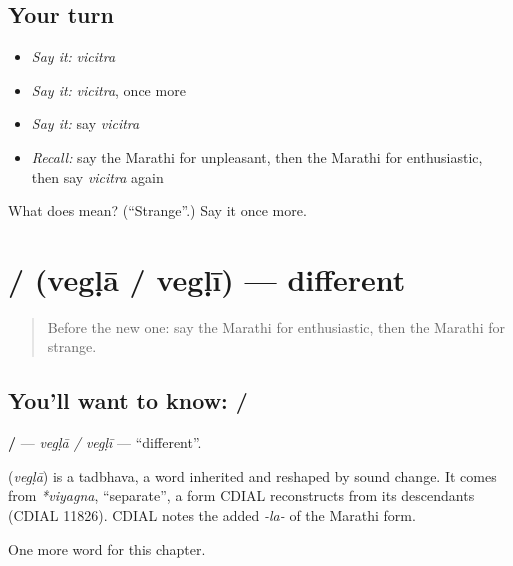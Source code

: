 \subsection*{Your turn}
\begin{itemize}
\raggedright
  \item \emph{Say it:} \emph{vicitra}
  \item \emph{Say it:} \emph{vicitra}, once more
  \item \emph{Say it:} say \emph{vicitra}
  \item \emph{Recall:} say the Marathi for unpleasant, then the Marathi for enthusiastic, then say \emph{vicitra} again
\end{itemize}

\begin{tcolorbox}[breakable,colback=teal!4,colframe=teal!35!black,title={Before you move on}]
What does  mean? (\textquotedblleft{}Strange\textquotedblright{}.) Say it once more.
\end{tcolorbox}
\section[\texorpdfstring{\mr{वेगळा} / \mr{वेगळी} (vegḷā / vegḷī)}{वेगळा / वेगळी (vegḷā / vegḷī)}]{ /  (vegḷā / vegḷī) — different}

\label{lesson:MR-C175-vegla}



\begin{quote}
Before the new one: say the Marathi for enthusiastic, then the Marathi for strange.
\end{quote}

\subsection*{You'll want to know:  / }
\textbf{ / } — \emph{vegḷā / vegḷī} — \textquotedblleft{}different\textquotedblright{}.

\begin{cousinweb}
\textbf{} (\emph{vegḷā}) is a tadbhava, a word inherited and reshaped by sound change. It comes from \emph{*viyagna}, \textquotedblleft{}separate\textquotedblright{}, a form CDIAL reconstructs from its descendants (CDIAL 11826). CDIAL notes the added \emph{-la-} of the Marathi form.
\end{cousinweb}

\begin{grammarlens}[title={What you've built}]
One more word for this chapter.
\end{grammarlens}

